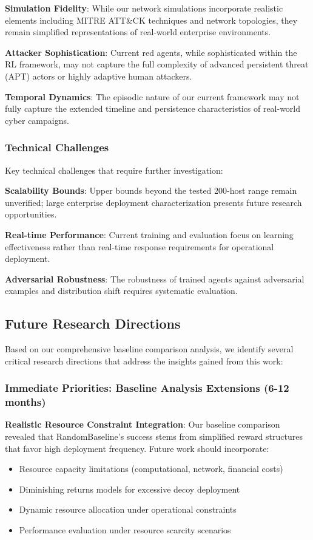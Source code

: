 \documentclass[12pt,twoside]{article}
\theoremstyle{definition}
\theoremstyle{plain}
\begin{document}
\textbf{Simulation Fidelity}: While our network simulations incorporate realistic elements including MITRE ATT\&CK techniques and network topologies, they remain simplified representations of real-world enterprise environments.

\textbf{Attacker Sophistication}: Current red agents, while sophisticated within the RL framework, may not capture the full complexity of advanced persistent threat (APT) actors or highly adaptive human attackers.

\textbf{Temporal Dynamics}: The episodic nature of our current framework may not fully capture the extended timeline and persistence characteristics of real-world cyber campaigns.

\subsubsection{Technical Challenges}
Key technical challenges that require further investigation:

\textbf{Scalability Bounds}: Upper bounds beyond the tested 200-host range remain unverified; large enterprise deployment characterization presents future research opportunities.

\textbf{Real-time Performance}: Current training and evaluation focus on learning effectiveness rather than real-time response requirements for operational deployment.

\textbf{Adversarial Robustness}: The robustness of trained agents against adversarial examples and distribution shift requires systematic evaluation.

\subsection{Future Research Directions}

Based on our comprehensive baseline comparison analysis, we identify several critical research directions that address the insights gained from this work:

\subsubsection{Immediate Priorities: Baseline Analysis Extensions (6-12 months)}

\textbf{Realistic Resource Constraint Integration}: Our baseline comparison revealed that RandomBaseline's success stems from simplified reward structures that favor high deployment frequency. Future work should incorporate:
\begin{itemize}
\item Resource capacity limitations (computational, network, financial costs)
\item Diminishing returns models for excessive decoy deployment
\item Dynamic resource allocation under operational constraints
\item Performance evaluation under resource scarcity scenarios
\end{itemize}
\end{document}
